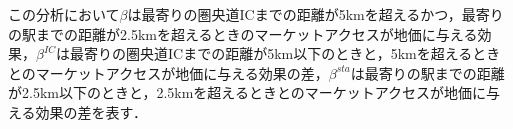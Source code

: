 この分析において$\beta$は最寄りの圏央道ICまでの距離が5kmを超えるかつ，最寄りの駅までの距離が2.5kmを超えるときのマーケットアクセスが地価に与える効果，$\beta^{IC}$は最寄りの圏央道ICまでの距離が5km以下のときと，5kmを超えるときとのマーケットアクセスが地価に与える効果の差，$\beta^{sta}$は最寄りの駅までの距離が2.5km以下のときと，2.5kmを超えるときとのマーケットアクセスが地価に与える効果の差を表す．

